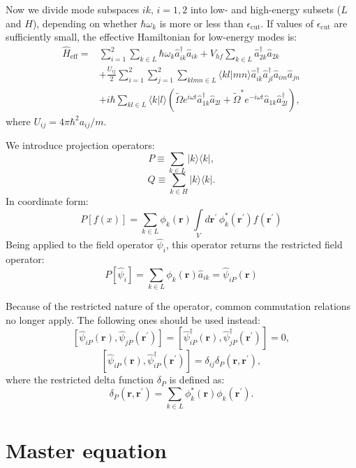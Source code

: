 \documentclass[12pt,notitlepage]{report}
\begin{document}
Now we divide mode subspaces $ik,\,i=1,2$ into low- and high-energy subsets ($L$ and $H$),
depending on whether $\hbar \omega_{k}$ is more or less than $\epsilon_{\textrm{cut}}$.
If values of $\epsilon_{\textrm{cut}}$ are sufficiently small, the effective Hamiltonian for low-energy modes is:
\begin{equation*}
\begin{split}
\hat{H}_{\textrm{eff}} = &
	\sum\limits_{i=1}^2 \sum\limits_{k \in L} \hbar \omega_{k} \hat{a}_{ik}^\dagger \hat{a}_{ik} +
	V_{hf} \sum\limits_{k \in L} \hat{a}_{2k}^\dagger \hat{a}_{2k} \\
	& + \frac{U_{ij}}{2} \sum\limits_{i=1}^2 \sum\limits_{j=1}^2 \sum\limits_{klmn \in L}
		\langle kl \vert mn \rangle
		\hat{a}_{ik}^\dagger \hat{a}_{jl}^\dagger \hat{a}_{im} \hat{a}_{jn} \\
	& + i \hbar \sum\limits_{kl \in L} \langle k \vert l \rangle \left(
		\tilde{\Omega} e^{i \omega t} \hat{a}_{1k}^\dagger \hat{a}_{2l} +
		\tilde{\Omega}^* e^{-i \omega t} \hat{a}_{1k} \hat{a}_{2l}^\dagger
	\right),
\end{split}
\end{equation*}
where $U_{ij} = 4 \pi \hbar^2 a_{ij} / m$.

We introduce projection operators:
\[ P \equiv \sum\limits_{k \in L} \lvert k \rangle \langle k \rvert, \]
\[ Q \equiv \sum\limits_{k \in H} \lvert k \rangle \langle k \rvert. \]
In coordinate form:
\[
P [f(x)] = \sum\limits_{k \in L} \phi_{k} (\mathbf{r}) \int\limits_V d\mathbf{r}^\prime\, \phi_{k}^*(\mathbf{r}^\prime) f(\mathbf{r}^\prime)
\]
Being applied to the field operator $\hat{\psi}_i$, this operator returns the restricted field operator:
\[
P [\hat{\psi}_i] = \sum\limits_{k \in L} \phi_{k} (\mathbf{r}) \hat{a}_{ik} = \hat{\psi}_{iP} (\mathbf{r})
\]

Because of the restricted nature of the operator, common commutation relations no longer apply.
The following ones should be used instead:
\[
\left[ \hat{\psi}_{iP}(\mathbf{r}), \hat{\psi}_{jP}(\mathbf{r}^\prime) \right] =
\left[ \hat{\psi}_{iP}^\dagger(\mathbf{r}), \hat{\psi}_{jP}^\dagger(\mathbf{r}^\prime) \right] = 0,
\]
\[
\left[ \hat{\psi}_{iP}(\mathbf{r}), \hat{\psi}_{iP}^\dagger(\mathbf{r}^\prime) \right] = \delta_{ij} \delta_{P}(\mathbf{r}, \mathbf{r}^\prime),
\]
where the restricted delta function $\delta_P$ is defined as:
\[
\delta_{P}(\mathbf{r}, \mathbf{r}^\prime) = \sum\limits_{k \in L} \phi_{k}^* (\mathbf{r}) \phi_{k} (\mathbf{r}^\prime).
\]

\section{Master equation}
\end{document}
